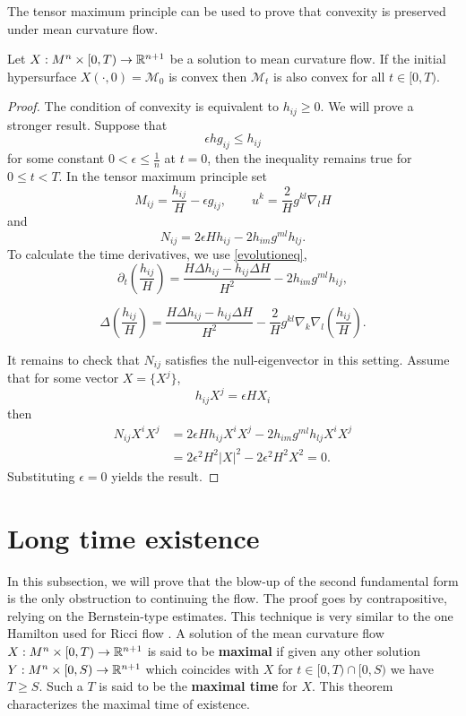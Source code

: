 The tensor maximum principle can be used to prove that convexity is preserved under mean curvature flow. 

\begin{lemma}
    Let $ X: M^{n} \times [0, T) \to \mathbb{R}^{n+1} $ be a solution to mean curvature flow. If the initial hypersurface $ X(\cdot, 0) = \mathcal{M}_{0}$ is convex then $ \mathcal{M}_{t} $ is also convex for all $ t \in [0,T) $.
\end{lemma}
\begin{proof}
    The condition of convexity is equivalent to $ h_{ij} \ge 0 $. We will prove a stronger result. Suppose that 
    \[ \epsilon h g_{ij} \le h_{ij} \]
    for some constant $ 0 < \epsilon \le \frac{1}{n} $ at $ t = 0 $, then the inequality remains true for $ 0 \le t <T $. In the tensor maximum principle set 
    \[ M_{ij} = \frac{h_{ij}}{H} - \epsilon g_{ij}, \qquad u^{k} = \frac{2}{H}g^{kl} \nabla_{l}H \]
    and 
    \[ N_{ij} = 2 \epsilon H h_{ij} - 2h_{im}g^{ml}h_{lj}. \]
    To calculate the time derivatives, we use \cref{evolutioneq}, 
    \[ \partial_{t}\left( \frac{h_{ij}}{H} \right) = \frac{H \Delta h_{ij}- h_{ij}\Delta H}{H^{2}} - 2h_{im}g^{ml}h_{ij},  \]
    
    \[ \Delta \left( \frac{h_{ij}}{H} \right)  = \frac{H \Delta h_{ij}- h_{ij} \Delta H }{H^{2}} - \frac{2}{H}g^{kl}\nabla_{k
    }\nabla_{l}\left( \frac{h_{ij}}{H}\right).\]


    It remains to check that $ N_{ij} $ satisfies the null-eigenvector in this setting. Assume that for some vector $ X = \{X^{j}\} $, 
    \[ h_{ij}  X^{j} = \epsilon HX_{i} \]
    then \begin{align*}
        N_{ij}X^{i}X^{j} & = 2 \epsilon H h_{ij}X^{i}X^{j} - 2h_{im}g^{ml}h_{lj}X^{i}X^{j} \\
        & = 2 \epsilon^{2}H^{2}|X|^{2} - 2 \epsilon^{2}H^{2}X^{2} = 0. 
    \end{align*}
    Substituting $ \epsilon = 0 $ yields the result. 
\end{proof}


\section{Long time existence}\label{Longtime}

In this subsection, we will prove that the blow-up of the second fundamental form is the only obstruction to continuing the flow. The proof goes by contrapositive, relying on the Bernstein-type estimates. This technique is very similar to the one Hamilton used for Ricci flow \cite{hamilton1982three}. A solution of the mean curvature flow $ X : M^{n} \times [0,T) \to \mathbb{R}^{n+1} $ is said to be \textbf{maximal}  if given any other solution $ Y : M^{n} \times [0,S) \to \mathbb{R}^{n+1} $ which coincides with $ X $ for $ t \in [0,T) \cap [0,S) $ we have $ T \ge S $. Such a $ T $ is said to be the \textbf{maximal time} for $ X $. This theorem characterizes the maximal time of existence.

